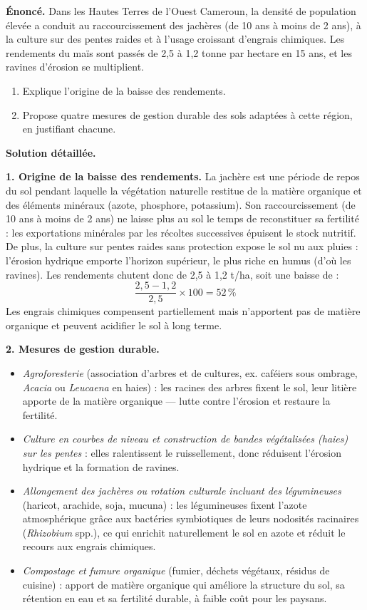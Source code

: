 \documentclass[11pt]{article}
\begin{document}
\begin{exoresolu}
\textbf{Énoncé.} Dans les Hautes Terres de l'Ouest Cameroun, la densité de population élevée a conduit au raccourcissement des jachères (de 10 ans à moins de 2 ans), à la culture sur des pentes raides et à l'usage croissant d'engrais chimiques. Les rendements du maïs sont passés de 2,5 à 1,2 tonne par hectare en 15 ans, et les ravines d'érosion se multiplient.
\begin{enumerate}
\item Explique l'origine de la baisse des rendements.
\item Propose quatre mesures de gestion durable des sols adaptées à cette région, en justifiant chacune.
\end{enumerate}
\tcblower
\textbf{Solution détaillée.}

\textbf{1. Origine de la baisse des rendements.} La jachère est une période de repos du sol pendant laquelle la végétation naturelle restitue de la matière organique et des éléments minéraux (azote, phosphore, potassium). Son raccourcissement (de 10 ans à moins de 2 ans) ne laisse plus au sol le temps de reconstituer sa fertilité : les exportations minérales par les récoltes successives épuisent le stock nutritif. De plus, la culture sur pentes raides sans protection expose le sol nu aux pluies : l'érosion hydrique emporte l'horizon supérieur, le plus riche en humus (d'où les ravines). Les rendements chutent donc de 2,5 à 1,2 t/ha, soit une baisse de :
\[ \frac{2{,}5 - 1{,}2}{2{,}5} \times 100 = 52 \,\% \]
Les engrais chimiques compensent partiellement mais n'apportent pas de matière organique et peuvent acidifier le sol à long terme.

\textbf{2. Mesures de gestion durable.}
\begin{itemize}
\item \emph{Agroforesterie} (association d'arbres et de cultures, ex. caféiers sous ombrage, \emph{Acacia} ou \emph{Leucaena} en haies) : les racines des arbres fixent le sol, leur litière apporte de la matière organique — lutte contre l'érosion et restaure la fertilité.
\item \emph{Culture en courbes de niveau et construction de bandes végétalisées (haies) sur les pentes} : elles ralentissent le ruissellement, donc réduisent l'érosion hydrique et la formation de ravines.
\item \emph{Allongement des jachères ou rotation culturale incluant des légumineuses} (haricot, arachide, soja, mucuna) : les légumineuses fixent l'azote atmosphérique grâce aux bactéries symbiotiques de leurs nodosités racinaires (\emph{Rhizobium} spp.), ce qui enrichit naturellement le sol en azote et réduit le recours aux engrais chimiques.
\item \emph{Compostage et fumure organique} (fumier, déchets végétaux, résidus de cuisine) : apport de matière organique qui améliore la structure du sol, sa rétention en eau et sa fertilité durable, à faible coût pour les paysans.
\end{itemize}


\end{exoresolu}
\end{document}
